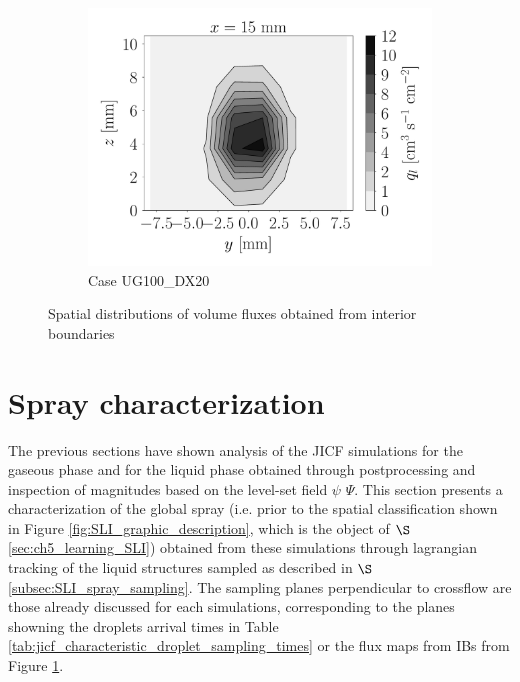 \begin{figure}[ht]
\begin{subfigure}[b]{1.1\textwidth}
   \includegraphics[scale=0.225]{./part2_developments/figures_ch5_resolved_JICF/flow_rates_ibs/spatial_maps/UG100_DX20_x15mm_volume_flux}
   \vspace*{-0.1in}
	\caption{Case UG100\_DX20}
\end{subfigure}


   \caption{Spatial distributions of volume fluxes obtained from interior boundaries}
\label{fig:ibs_spatial_distributions}
\end{figure}

\clearpage

\section{Spray characterization}
\label{sec:ch5_sec_spray_characterization}


The previous sections have shown analysis of the JICF simulations for the gaseous phase and for the liquid phase obtained through postprocessing and inspection of magnitudes based on the level-set field $\psi$ $\Psi$. This section presents a characterization of the global spray (i.e. prior to the spatial classification shown in Figure \ref{fig:SLI_graphic_description}, which is the object of $\S$\ref{sec:ch5_learning_SLI}) obtained from these simulations through lagrangian tracking of the liquid structures sampled as described in $\S$\ref{subsec:SLI_spray_sampling}. The sampling planes perpendicular to crossflow are those already discussed for each simulations, corresponding to the planes showning the droplets arrival times in Table \ref{tab:jicf_characteristic_droplet_sampling_times} or the flux maps from IBs from Figure \ref{fig:ibs_spatial_distributions}.

